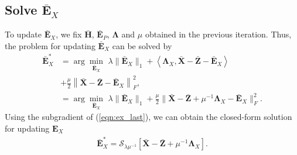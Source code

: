 \documentclass[10pt,journal,compsoc]{IEEEtran}
\begin{document}
\subsection{Solve $\bar{\mathbf{E}}_X$}
To update $\bar{\mathbf{E}}_X$, we fix $\bar{\mathbf{H}}$, $\bar{\mathbf{E}}_P$, $\mathbf{\Lambda}$ and $\mu$ obtained in the previous iteration.
Thus, the problem for updating $\bar{\mathbf{E}}_X$ can be solved by
\begin{align}
\nonumber \bar{\mathbf{E}}_X^* &= \arg\!\min_{\bar{\mathbf{E}}_X} \,\,  \lambda \|\bar{\mathbf{E}}_X\|_1
 + \left \langle  \mathbf{\Lambda}_X , \bar{\mathbf{X}} - \bar{\mathbf{Z}} - \bar{\mathbf{E}}_X
 \right \rangle \\
 \nonumber & + \frac{\mu}{2}  \left\|
\bar{\mathbf{X}} - \bar{\mathbf{Z}} - \bar{\mathbf{E}}_X
 \right\|_F^2, \\
&= \arg\!\min_{\bar{\mathbf{E}}_X} \,\, \lambda \|\bar{\mathbf{E}}_X\|_1  + \frac{\mu}{2} \| \bar{\mathbf{X}} - \bar{\mathbf{Z}}  + \mu^{-1}\mathbf{\Lambda}_X - \bar{\mathbf{E}}_X \|_F^2. \label{eqn:ex_last}
\end{align}
Using the subgradient of (\ref{eqn:ex_last}), we can obtain the closed-form solution for updating $\mathbf{E}_X$
\begin{align}
\bar{\mathbf{E}}_X^* = \mathcal{S}_{\lambda \mu^{-1}}[ \bar{\mathbf{X}} - \bar{\mathbf{Z}} + \mu^{-1} \mathbf{\Lambda}_X].
\end{align}
\end{document}
